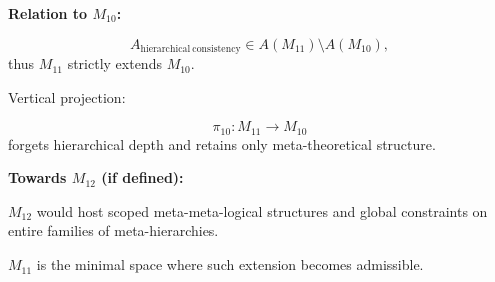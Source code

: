 \textbf{Relation to $M_{10}$:}

\[
A_{\mathrm{hierarchical\ consistency}} \in A(M_{11}) \setminus A(M_{10}),
\]
thus $M_{11}$ strictly extends $M_{10}$.

Vertical projection:

\[
\pi_{10}: M_{11} \to M_{10}
\]
forgets hierarchical depth and retains only meta-theoretical structure.

\textbf{Towards $M_{12}$ (if defined):}

$M_{12}$ would host scoped meta-meta-logical structures and
global constraints on entire families of meta-hierarchies.

$M_{11}$ is the minimal space where such extension becomes admissible.
